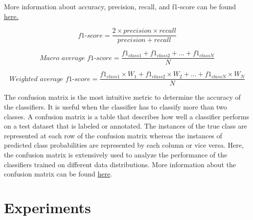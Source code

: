 More information about accuracy, precision, recall, and f1-score can be found \href{https://en.wikipedia.org/wiki/Precision_and_recall}{here\footnotemark.}


\begin{equation}\label{f1-score}
\textit{f1-score} = \frac{2 \times precision \times recall}{precision + recall}
\end{equation}


\begin{equation}\label{macrof1-score} 
\textit{Macro average f1-score} =  \frac{f1_{class1} + f1_{class2}+ ... + f1_{classN}}{N}
\end{equation}


\begin{equation}\label{Weightedf1-score} 
\textit{Weighted average f1-score} =  \frac{f1_{class1} \times W_1 + f1_{class2} \times W_2 + ... + f1_{classN} \times W_N}{N}
\end{equation}



The confusion matrix is the most intuitive metric to determine the accuracy of the classifiers. It is useful when the classifier has to classify more than two classes. A confusion matrix is a table that describes how well a classifier performs on a test dataset that is labeled or annotated. The instances of the true class are represented at each row of the confusion matrix whereas the instances of predicted class probabilities are represented by each column or vice versa. Here, the confusion matrix is extensively used to analyze the performance of the classifiers trained on different data distributions. More information about the confusion matrix can be found \href{https://en.wikipedia.org/wiki/Confusion_matrix}{here}\footnotemark.


\section{Experiments}\label{experiments}


